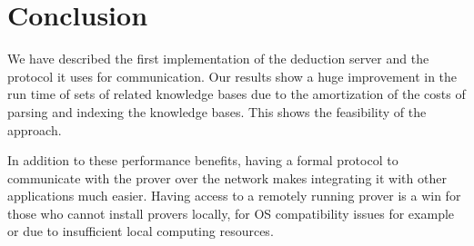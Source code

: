 \chapter{Conclusion}\label{chap:concl}

We have described the first implementation of the deduction server and the protocol it uses for communication. Our results show a huge improvement in the run time of sets of related knowledge bases due to the amortization of the costs of parsing and indexing the knowledge bases. This shows the feasibility of the approach.

 In addition to these performance benefits, having a formal protocol to communicate with the prover over the network makes integrating it with other applications much easier. Having access to a remotely running prover is a win for those who cannot install provers locally, for OS compatibility issues for example or due to insufficient local computing resources.
